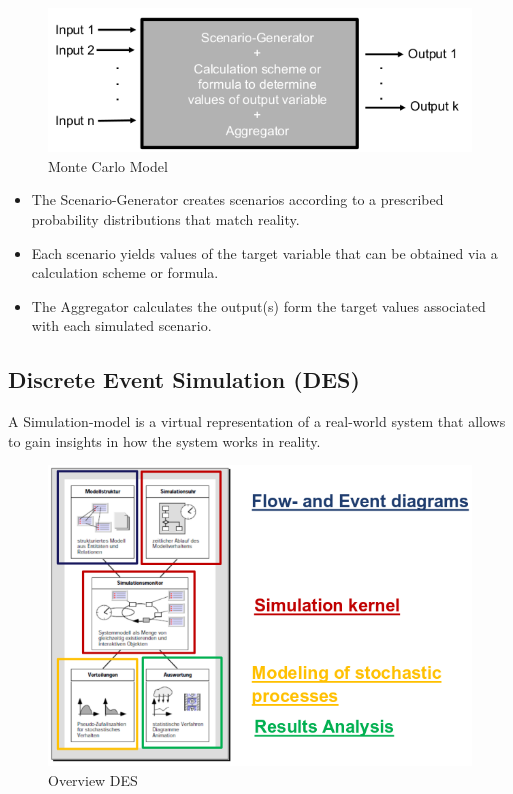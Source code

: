\begin{figure}[H]
\centering
\includegraphics[width=.75\textwidth]{figures/montecarloModel.png}
\caption{Monte Carlo Model}
\end{figure}

\begin{itemize}
	\tightlist
	\item The Scenario-Generator creates scenarios according to a prescribed
	probability distributions that match reality.
	\item Each scenario yields values of the target variable that can be
	obtained via a calculation scheme or formula.
	\item The Aggregator calculates the output(s) form the target values
	associated with each simulated scenario.
\end{itemize}

\subsection{Discrete Event Simulation (DES)}

A Simulation-model is a virtual representation of a real-world system
that allows to gain insights in how the system works in reality.

\begin{figure}[H]
	\centering
	\includegraphics[width=.85\textwidth]{figures/overviewDES.png}
	\caption{Overview DES}
\end{figure}

